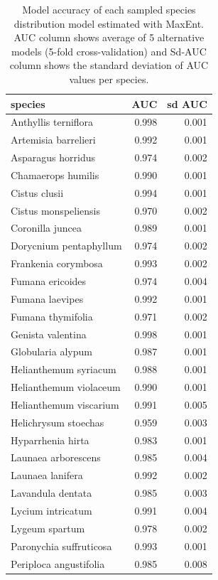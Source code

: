 \documentclass[11pt,twoside]{reedthesis}
\begin{document}
\begin{table}[H]

\caption[Model accuracy of each sampled species distribution model estimated with MaxEnt.]{\label{tab:unnamed-chunk-26}Model accuracy of each sampled species distribution model estimated with MaxEnt. AUC column shows average of 5 alternative models (5-fold cross-validation) and Sd-AUC column shows the standard deviation of AUC values per species.}
\centering
\fontsize{8}{10}\selectfont
\begin{tabular}[t]{lrr}
\toprule
species & AUC & sd AUC\\
\midrule
Anthyllis terniflora & 0.998 & 0.001\\
Artemisia barrelieri & 0.992 & 0.001\\
Asparagus horridus & 0.974 & 0.002\\
Chamaerops humilis & 0.990 & 0.001\\
Cistus clusii & 0.994 & 0.001\\
Cistus monspeliensis & 0.970 & 0.002\\
Coronilla juncea & 0.989 & 0.001\\
Dorycnium pentaphyllum & 0.974 & 0.002\\
Frankenia corymbosa & 0.993 & 0.002\\
Fumana ericoides & 0.974 & 0.004\\
Fumana laevipes & 0.992 & 0.001\\
Fumana thymifolia & 0.971 & 0.002\\
Genista valentina & 0.998 & 0.001\\
Globularia alypum & 0.987 & 0.001\\
Helianthemum syriacum & 0.988 & 0.001\\
Helianthemum violaceum & 0.990 & 0.001\\
Helianthemum viscarium & 0.991 & 0.005\\
Helichrysum stoechas & 0.959 & 0.003\\
Hyparrhenia hirta & 0.983 & 0.001\\
Launaea arborescens & 0.985 & 0.004\\
Launaea lanifera & 0.992 & 0.002\\
Lavandula dentata & 0.985 & 0.003\\
Lycium intricatum & 0.991 & 0.004\\
Lygeum spartum & 0.978 & 0.002\\
Paronychia suffruticosa & 0.993 & 0.001\\
Periploca angustifolia & 0.985 & 0.008\\

\end{tabular}
\end{table}
\end{document}
